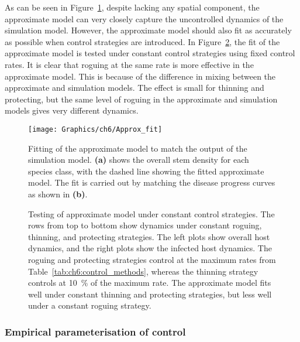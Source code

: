 As can be seen in Figure~\ref{fig:ch6:approx_fit}, despite lacking any spatial component, the approximate model can very closely capture the uncontrolled dynamics of the simulation model. However, the approximate model should also fit as accurately as possible when control strategies are introduced. In Figure~\ref{fig:ch6:fit_under_control}, the fit of the approximate model is tested under constant control strategies using fixed control rates. It is clear that roguing at the same rate is more effective in the approximate model. This is because of the difference in mixing between the approximate and simulation models. The effect is small for thinning and protecting, but the same level of roguing in the approximate and simulation models gives very different dynamics.

\begin{figure}[t]
    \begin{center}
        \texttt{[image: Graphics/ch6/Approx\_fit]}
        \caption[Fitting of approximate model]{Fitting of the approximate model to match the output of the simulation model. \textbf{(a)} shows the overall stem density for each species class, with the dashed line showing the fitted approximate model. The fit is carried out by matching the disease progress curves as shown in \textbf{(b)}\label{fig:ch6:approx_fit}.}
    \end{center}
\end{figure}

\begin{figure}
    \begin{center}
        \caption[Testing of approximate model under control]{Testing of approximate model under constant control strategies. The rows from top to bottom show dynamics under constant roguing, thinning, and protecting strategies. The left plots show overall host dynamics, and the right plots show the infected host dynamics. The roguing and protecting strategies control at the maximum rates from Table~\ref{tab:ch6:control_methods}, whereas the thinning strategy controls at \SI{10}{\percent} of the maximum rate. The approximate model fits well under constant thinning and protecting strategies, but less well under a constant roguing strategy.\label{fig:ch6:fit_under_control}}
    \end{center}
\end{figure}

\subsubsection{Empirical parameterisation of control}\label{sec:ch6:control_scaling}

